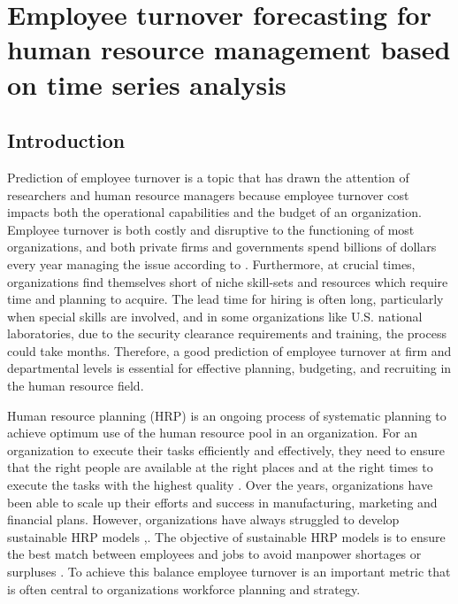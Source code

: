 \chapter{Employee turnover forecasting for human resource management based on time series analysis}\label{ch:timesereis}
\section{Introduction}
Prediction of employee turnover is a topic that has drawn the attention of researchers and human resource managers because employee turnover cost impacts both the operational capabilities and the budget of an organization. Employee turnover is both costly and disruptive to the functioning of most organizations, and both private firms and governments spend billions of dollars every year managing the issue according to \citet{leonard2001} . Furthermore, at crucial times, organizations find themselves short of niche skill-sets and resources which require time and planning to acquire. The lead time for hiring is often long, particularly when special skills are involved, and in some organizations like U.S. national laboratories, due to the security clearance requirements and training, the process could take months. Therefore, a good prediction of employee turnover at firm and departmental levels is essential for effective planning, budgeting, and recruiting in the human resource field. 

Human resource planning (HRP) is an ongoing process of systematic planning to achieve optimum use of the human resource pool in an organization. For an organization to execute their tasks efficiently and effectively, they need to ensure that the right people are available at the right places and at the right times to execute the tasks with the highest quality \citep{khoong1996}. Over the years, organizations have been able to scale up their efforts and success in manufacturing, marketing and financial plans. However, organizations have always struggled to develop sustainable HRP models \citep{heneman1993},. The objective of sustainable HRP models is to ensure the best match between employees and jobs to avoid manpower shortages or surpluses \citep{cambal2011}. To achieve this balance employee turnover is an important metric that is often central to organizations workforce planning and strategy.

